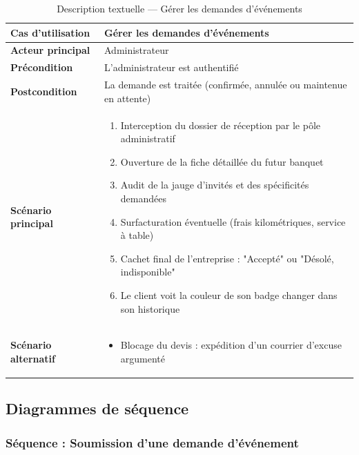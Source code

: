 \begin{table}[H]
    \centering
    \caption{Description textuelle --- Gérer les demandes d'événements}
    \label{tab:desc_gerer_events}
    \renewcommand{\arraystretch}{1.3}
    \begin{tabular}{|p{4cm}|p{8.5cm}|}
        \hline
        \textbf{Cas d'utilisation} & Gérer les demandes d'événements \\
        \hline
        \textbf{Acteur principal} & Administrateur \\
        \hline
        \textbf{Précondition} & L'administrateur est authentifié \\
        \hline
        \textbf{Postcondition} & La demande est traitée (confirmée, annulée ou maintenue en attente) \\
        \hline
        \textbf{Scénario principal} &
        \begin{enumerate}
            \item Interception du dossier de réception par le pôle administratif
            \item Ouverture de la fiche détaillée du futur banquet
            \item Audit de la jauge d'invités et des spécificités demandées
            \item Surfacturation éventuelle (frais kilométriques, service à table)
            \item Cachet final de l'entreprise : "Accepté" ou "Désolé, indisponible"
            \item Le client voit la couleur de son badge changer dans son historique
        \end{enumerate} \\
        \hline
        \textbf{Scénario alternatif} &
        \begin{itemize}
            \item[5a.] Blocage du devis : expédition d'un courrier d'excuse argumenté
        \end{itemize} \\
        \hline
    \end{tabular}
\end{table}

\subsection{Diagrammes de séquence}

\subsubsection{Séquence : Soumission d'une demande d'événement}

